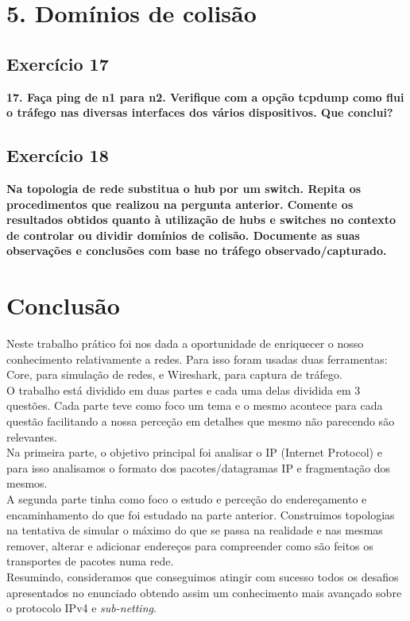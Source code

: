 \documentclass[a4paper]{report}
\begin{document}
\chapter{5. Domínios de colisão}
\section{Exercício 17}
\textbf{17. Faça ping de n1 para n2. Verifique com a opção tcpdump como flui o
tráfego nas diversas interfaces dos vários dispositivos. Que conclui?}


\section{Exercício 18}
\textbf{Na topologia de rede substitua o hub por um switch. Repita os
procedimentos que realizou na pergunta anterior. Comente os resultados obtidos
quanto à utilização de hubs e switches no contexto de controlar ou dividir
domínios de colisão. Documente as suas observações e conclusões com base no
tráfego observado/capturado.}


\chapter{Conclusão}
Neste trabalho prático foi nos dada a oportunidade de enriquecer o nosso conhecimento
relativamente a redes. Para isso foram usadas duas ferramentas: Core, para simulação de 
redes, e Wireshark, para captura de tráfego.\\
O trabalho está dividido em duas partes e cada uma delas dividida em 3 questões.
Cada parte teve como foco um tema e o mesmo acontece para cada questão facilitando a
nossa perceção em detalhes que mesmo não parecendo são relevantes.\\
Na primeira parte, o objetivo principal foi analisar o IP (Internet Protocol) e para isso
analisamos o formato dos pacotes/datagramas IP e fragmentação dos mesmos.\\
A segunda parte tinha como foco o estudo e perceção do endereçamento e encaminhamento do
que foi estudado na parte anterior. Construimos topologias na tentativa de simular 
o máximo do que se passa na realidade e nas mesmas remover, alterar e adicionar 
endereços para compreender como são feitos os transportes de pacotes numa rede.\\
Resumindo, consideramos que conseguimos atingir com sucesso todos os
desafios apresentados no enunciado obtendo assim um conhecimento mais avançado
sobre o protocolo IPv4 e \textit{sub-netting}.
\end{document}

